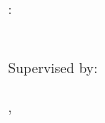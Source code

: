 \thispagestyle{empty}

\hfill

\vfill

\noindent\spacedlowsmallcaps{\myName}: \\
\textit{\myTitle} \\
{\small\textit{\mySubtitle}} \\[\baselineskip]
\noindent Supervised by: \\
{\spacedlowsmallcaps{\myProf}} \\[\baselineskip]
\myLocation, \myTime
